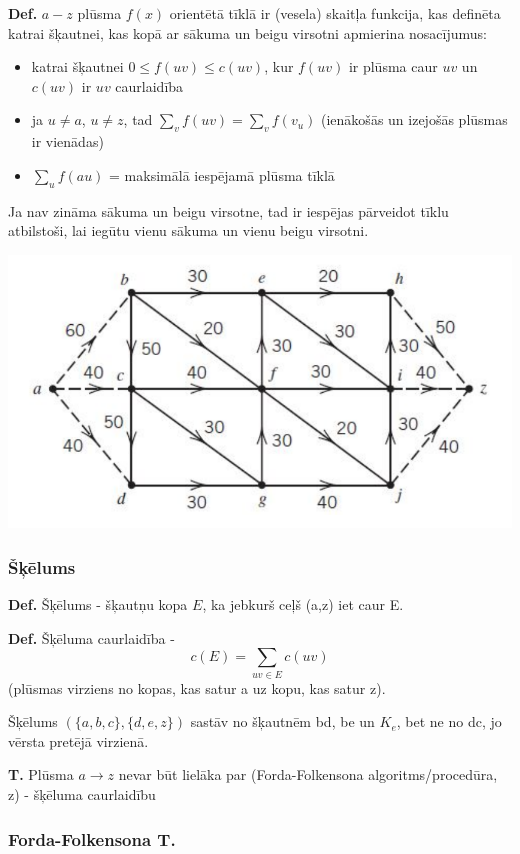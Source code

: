 \documentclass{article}
\begin{document}
\textbf{Def.} $a-z$ plūsma $f(x)$ orientētā tīklā ir (vesela) skaitļa funkcija, kas definēta katrai šķautnei, kas kopā ar sākuma un beigu virsotni apmierina nosacījumus:
\begin{itemize}
	\item katrai šķautnei $0 \le f(uv) \le c(uv) $, kur $f(uv)$ ir plūsma caur $uv$ un $c(uv)$ ir $uv$ caurlaidība
	\item ja $u \ne a$, $u \ne z$, tad $\sum_{v}{f(uv)} = \sum_{v}{f(v_u)}$ (ienākošās un izejošās plūsmas ir vienādas)
	\item $\sum_{u}{f(au)}$ = maksimālā iespējamā plūsma tīklā
\end{itemize}


Ja nav zināma sākuma un beigu virsotne, tad ir iespējas pārveidot tīklu atbilstoši, lai iegūtu vienu sākuma un vienu beigu virsotni.

\begin{center}
\includegraphics[width=0.5\linewidth]{network_extension-1}
\end{center}

\subsubsection{Šķēlums}

\textbf{Def.}  Šķēlums - šķautņu kopa $E$, ka jebkurš ceļš (a,z) iet caur E.

\textbf{Def.} Šķēluma caurlaidība - \begin{equation}c(E ) = \sum_{uv \in E}{c(uv)}\end{equation} (plūsmas virziens no kopas, kas satur a uz kopu, kas satur z).

Šķēlums $(\{a, b, c\}, \{d, e, z\})$ sastāv no šķautnēm bd, be un $K_e$, bet ne no dc, jo vērsta pretējā virzienā.

\textbf{T. } Plūsma $a \to z$ nevar būt lielāka par (Forda-Folkensona algoritms/procedūra, z) - šķēluma caurlaidību

\subsubsection{Forda-Folkensona T.}
\end{document}
